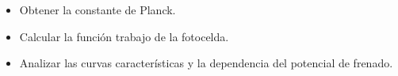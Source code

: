 \begin{itemize}
  \item Obtener la constante de Planck.
  \item Calcular la función trabajo de la fotocelda.
  \item Analizar las curvas características y la dependencia del potencial de frenado.
\end{itemize}

